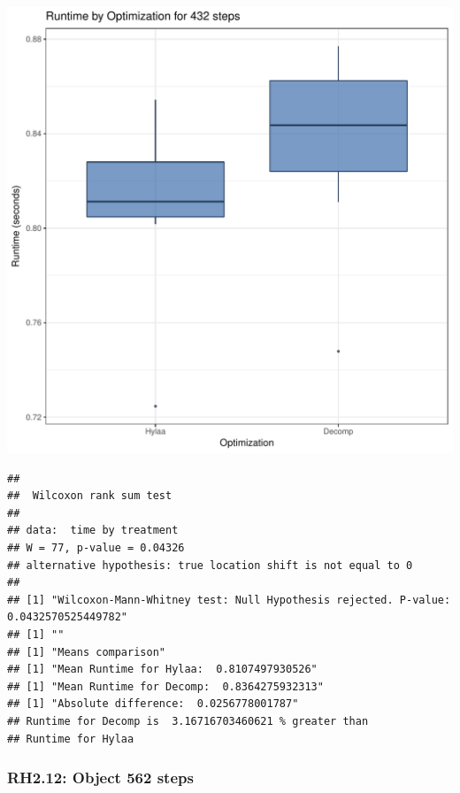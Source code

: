 \documentclass{article}\usepackage[]{graphicx}\usepackage[]{color}
\makeatletter
\def\maxwidth{ %
  \ifdim\Gin@nat@width>\linewidth
    \linewidth
  \else
    \Gin@nat@width
  \fi
}
\newenvironment{kframe}{%
 \def\at@end@of@kframe{}%
 \ifinner\ifhmode%
  \def\at@end@of@kframe{\end{minipage}}%
  \begin{minipage}{\columnwidth}%
 \fi\fi%
 \def\FrameCommand##1{\hskip\@totalleftmargin \hskip-\fboxsep
 \colorbox{shadecolor}{##1}\hskip-\fboxsep
     \hskip-\linewidth \hskip-\@totalleftmargin \hskip\columnwidth}%
 \MakeFramed {\advance\hsize-\width
   \@totalleftmargin\z@ \linewidth\hsize
   \@setminipage}}%
 {\par\unskip\endMakeFramed%
 \at@end@of@kframe}
\newenvironment{knitrout}{}{} %
\makeatother
\begin{document}
\begin{knitrout}
\color{fgcolor}
\includegraphics[width=\maxwidth]{figure/RH2_steps432-1} 
\begin{kframe}\begin{verbatim}
## 
## 	Wilcoxon rank sum test
## 
## data:  time by treatment
## W = 77, p-value = 0.04326
## alternative hypothesis: true location shift is not equal to 0
## 
## [1] "Wilcoxon-Mann-Whitney test: Null Hypothesis rejected. P-value: 0.0432570525449782"
## [1] ""
## [1] "Means comparison"
## [1] "Mean Runtime for Hylaa:  0.8107497930526"
## [1] "Mean Runtime for Decomp:  0.8364275932313"
## [1] "Absolute difference:  0.0256778001787"
## Runtime for Decomp is  3.16716703460621 % greater than 
## Runtime for Hylaa
\end{verbatim}
\end{kframe}
\end{knitrout}


\subsubsection{RH2.12: Object 562 steps}
\end{document}

